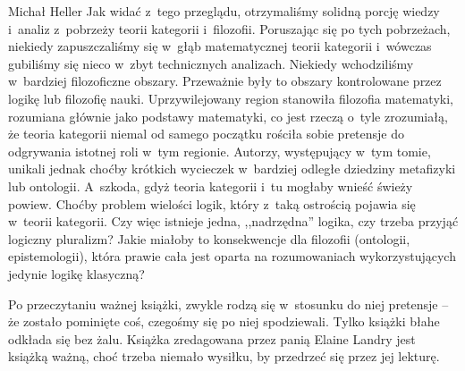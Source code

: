 \begin{recplenv}{Michał Heller}
Jak widać z~tego przeglądu, otrzymaliśmy solidną porcję wiedzy i~analiz z~pobrzeży teorii kategorii i~filozofii. Poruszając się po tych pobrzeżach, niekiedy zapuszczaliśmy się w~głąb matematycznej teorii kategorii i~wówczas gubiliśmy się nieco w~zbyt technicznych analizach. Niekiedy wchodziliśmy w~bardziej filozoficzne obszary. Przeważnie były to obszary kontrolowane przez logikę lub filozofię nauki. Uprzywilejowany region stanowiła filozofia matematyki, rozumiana głównie jako podstawy matematyki, co jest rzeczą o~tyle zrozumiałą, że teoria kategorii niemal od samego początku rościła sobie pretensje do odgrywania istotnej roli w~tym regionie. Autorzy, występujący w~tym tomie, unikali jednak choćby krótkich wycieczek w~bardziej odległe dziedziny metafizyki lub ontologii. A~szkoda, gdyż teoria kategorii i~tu mogłaby wnieść świeży powiew. Choćby problem wielości logik, który z~taką ostrością pojawia się w~teorii kategorii. Czy więc istnieje jedna, ,,nadrzędna'' logika, czy trzeba przyjąć logiczny pluralizm? Jakie miałoby to konsekwencje dla filozofii (ontologii, epistemologii), która prawie cała jest oparta na rozumowaniach wykorzystujących jedynie logikę klasyczną?

Po przeczytaniu ważnej książki, zwykle rodzą się w~stosunku do niej  pretensje -- że zostało pominięte coś, czegośmy się po niej spodziewali. Tylko książki błahe odkłada się bez żalu. Książka zredagowana przez panią Elaine Landry jest książką ważną, choć trzeba niemało wysiłku, by przedrzeć się przez jej lekturę.

\smallskip
{}



\end{recplenv}




